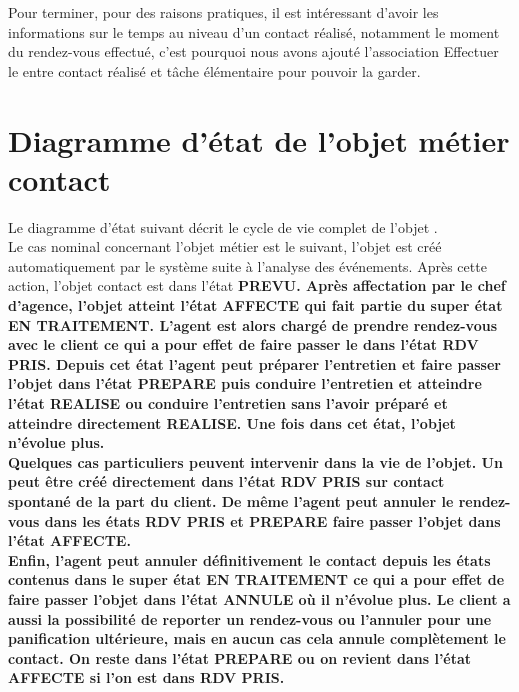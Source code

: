 Pour terminer, pour des raisons pratiques, il est intéressant d'avoir les informations sur le temps au niveau d'un contact réalisé, notamment le moment du rendez-vous effectué, c'est pourquoi nous avons ajouté l'association \og Effectuer le \fg{} entre contact réalisé et tâche élémentaire pour pouvoir la garder. \\

\section{Diagramme d’état de l'objet métier \bf{contact}}

Le diagramme d'état suivant décrit le cycle de vie complet de l'objet . \\

Le cas nominal concernant l'objet métier  est le suivant, l'objet est créé automatiquement par le système suite à l'analyse des événements. Après cette action, l'objet contact est dans l'état \bf{PREVU}. Après affectation par le chef d'agence, l'objet  atteint l'état \bf{AFFECTE} qui fait partie du super état \bf{EN TRAITEMENT}. L'agent est alors chargé de prendre rendez-vous avec le client ce qui a pour effet de faire passer le  dans l'état \bf{RDV PRIS}. Depuis cet état l'agent peut préparer l'entretien et faire passer l'objet  dans l'état \bf{PREPARE} puis conduire l'entretien et atteindre l'état \bf{REALISE} ou conduire l'entretien sans l'avoir préparé et atteindre directement \bf{REALISE}. Une fois dans cet état, l'objet  n'évolue plus. \\

Quelques cas particuliers peuvent intervenir dans la vie de l'objet. Un  peut être créé directement dans l'état \bf{RDV PRIS} sur contact spontané de la part du client. De même l'agent peut annuler le rendez-vous dans les états \bf{RDV PRIS} et \bf{PREPARE} faire passer l'objet  dans l'état \bf{AFFECTE}. \\

Enfin, l'agent peut annuler définitivement le contact depuis les états contenus dans le super état \bf{EN TRAITEMENT} ce qui a pour effet de faire passer l'objet  dans l'état \bf{ANNULE} où il n'évolue plus. Le client a aussi la possibilité de reporter un rendez-vous ou l'annuler pour une panification ultérieure, mais en aucun cas cela annule complètement le contact. On reste dans l'état \bf{PREPARE} ou on revient dans l'état \bf{AFFECTE} si l'on est dans \bf{RDV PRIS}.

